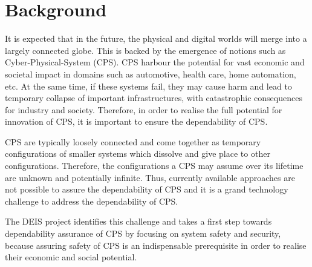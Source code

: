 \section{Background}
It is expected that in the future, the physical and digital worlds will merge into a largely connected globe. This is backed by the emergence of notions such as Cyber-Physical-System (CPS). 
CPS harbour the potential for vast economic and societal impact in domains such as automotive, health care, home automation, etc. At the same time, if these systems fail, they may cause harm and lead to temporary collapse of important infrastructures, with catastrophic consequences for industry and society. 
Therefore, in order to realise the full potential for innovation of CPS, it is important to ensure the dependability of CPS.

CPS are typically loosely connected and come together as temporary configurations of smaller systems which dissolve and give place to other configurations. Therefore, the configurations a CPS may assume over its lifetime are unknown and potentially infinite. Thus, currently available approaches are not possible to assure the dependability of CPS and it is a grand technology challenge to address the dependability of CPS. 

The DEIS project identifies this challenge and takes a first step towards dependability assurance of CPS by focusing on system safety and security, because assuring safety of CPS is an indispensable prerequisite in order to realise their economic and social potential.


